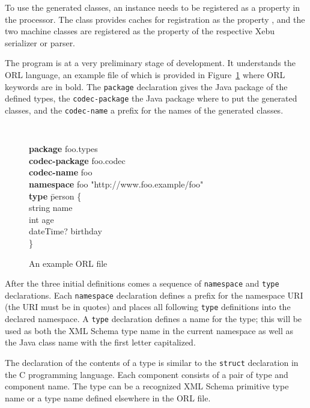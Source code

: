\documentclass[draft]{article}
\begin{document}
To use the generated classes, an instance needs to be registered as a
property in the processor.  The  class provides caches
for registration as the property
, and the two machine
classes are registered as the property
 of the respective Xebu
serializer or parser.

The program  is at a very preliminary stage of
development.  It understands the \ac{ORL} language, an example file of
which is provided in Figure~\ref{fig:orl-example} where \ac{ORL}
keywords are in bold.  The \texttt{package} declaration gives the Java
package of the defined types, the \texttt{codec-package} the Java
package where to put the generated classes, and the
\texttt{codec-name} a prefix for the names of the generated classes.

\begin{figure}[htb]
  \begin{center}
    \tt
    \begin{tabbing}
      \textbf{package} foo.types \\
      \textbf{codec-package} foo.codec \\
      \textbf{codec-name} foo \\
      \textbf{namespace} foo "http://www.foo.example/foo" \\
      \textbf{type} \= person \{ \\
      \> string name \\
      \> int age \\
      \> dateTime? birthday \\
      \}
    \end{tabbing}
  \end{center}
  \caption{An example \acs{ORL} file}
  \label{fig:orl-example}
\end{figure}

After the three initial definitions comes a sequence of
\texttt{namespace} and \texttt{type} declarations.  Each
\texttt{namespace} declaration defines a prefix for the namespace URI
(the URI must be in quotes) and places all following \texttt{type}
definitions into the declared namespace.  A \texttt{type} declaration
defines a name for the type; this will be used as both the XML Schema
type name in the current namespace as well as the Java class name with
the first letter capitalized.

The declaration of the contents of a type is similar to the
\texttt{struct} declaration in the C programming language.  Each
component consists of a pair of type and component name.  The type can
be a recognized XML Schema primitive type name or a type name defined
elsewhere in the \ac{ORL} file.
\end{document}
